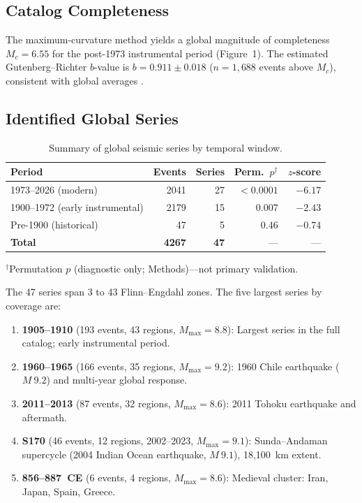 \documentclass[draft]{agujournal2019}
\begin{document}
\subsection{Catalog Completeness}

The maximum-curvature method yields a global magnitude of completeness
$M_c = 6.55$ for the post-1973 instrumental period (Figure~1).
The estimated Gutenberg--Richter $b$-value is $b = 0.911 \pm 0.018$
($n = 1{,}688$ events above $M_c$), consistent with global averages
\citep{Frohlich2002,Bird2009}.

\subsection{Identified Global Series}

\begin{table}[htbp]
\centering
\caption{Summary of global seismic series by temporal window.}
\label{tab:epochs}
\begin{tabular}{lrrrr}
\hline
Period & Events & Series & Perm.\ $p^\dagger$ & $z$-score \\
\hline
1973--2026 (modern)            & 2041 & 27 & $<0.0001$ & $-6.17$ \\
1900--1972 (early instrumental) & 2179 & 15 & $0.007$   & $-2.43$ \\
Pre-1900 (historical)          &   47 &  5 & $0.46$    & $-0.74$ \\
\hline
\textbf{Total}                 & \textbf{4267} & \textbf{47} & --- & --- \\
\hline
\end{tabular}
\end{table}

\noindent$^\dagger$Permutation $p$ (diagnostic only; Methods)---not primary validation.

The 47 series span 3 to 43 Flinn--Engdahl zones.
The five largest series by coverage are:

\begin{enumerate}
  \item \textbf{1905--1910} (193 events, 43 regions, $M_\mathrm{max}=8.8$):
        Largest series in the full catalog; early instrumental period.
  \item \textbf{1960--1965} (166 events, 35 regions, $M_\mathrm{max}=9.2$):
        1960 Chile earthquake ($M~9.2$) and multi-year global response.
  \item \textbf{2011--2013} (87 events, 32 regions, $M_\mathrm{max}=8.6$):
        2011 Tohoku earthquake and aftermath.
  \item \textbf{S170} (46 events, 12 regions, 2002--2023, $M_\mathrm{max}=9.1$):
        Sunda--Andaman supercycle (2004 Indian Ocean earthquake, $M~9.1$), 18{,}100~km extent.
  \item \textbf{856--887~CE} (6 events, 4 regions, $M_\mathrm{max}=8.6$):
        Medieval cluster: Iran, Japan, Spain, Greece.
\end{enumerate}
\end{document}
